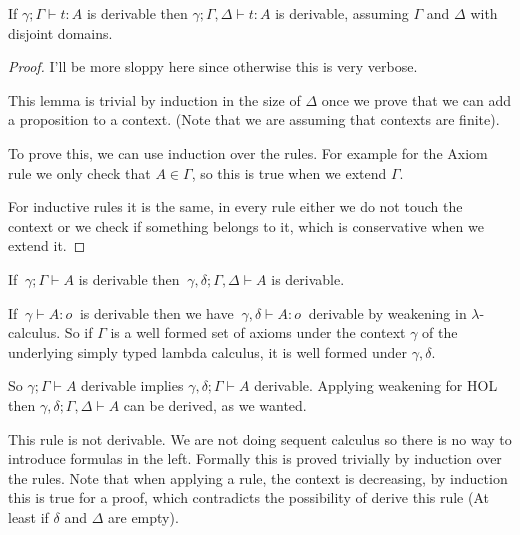\begin{lemma} 
\label{weakening}
  
  If $\gamma ; \Gamma \vdash t : A$ is derivable
  then $ \gamma ; \Gamma,\Delta \vdash t : A$ is derivable, assuming
  $\Gamma$ and $\Delta$ with disjoint domains.  
\end{lemma}

\begin{proof}
  I'll be more sloppy here since otherwise this is very verbose.

  This lemma is trivial by induction in the size of $\Delta$ once we prove
  that we can add a proposition to a context. (Note that we
  are assuming that contexts are finite).

  To prove this, we can use induction over the rules. For example for
  the Axiom rule
  we only check that $A \in \Gamma$, so this is true when we extend
  $\Gamma$.

  For inductive rules it is the same, in every rule either we do not touch
  the context or we check if something belongs to it, which is conservative
  when we extend it.
  
\end{proof}

\begin{theorem}[Exercise 21]
  If $\: \gamma ; \Gamma \vdash A$ is derivable then $\: \gamma, \delta ;
  \Gamma, \Delta \vdash A$ is derivable.
\end{theorem}

If $\: \gamma \vdash A : o \:$ is derivable then we have
$\:\gamma,\delta \vdash A : o \:$
derivable by weakening in $\lambda$-calculus.
So if $\Gamma$ is a well formed
set of axioms under the context $\gamma$ of the underlying simply typed
lambda calculus, it is well formed under $\gamma, \delta$.

So $\gamma; \Gamma \vdash A$ derivable implies
$\gamma,\delta; \Gamma \vdash A$ derivable.
Applying weakening for HOL then $\gamma,\delta; \Gamma, \Delta \vdash A$ can
be derived, as we wanted.

This rule is not derivable. We are not doing sequent calculus so there
is no way to introduce formulas in the left. Formally this is proved
trivially by induction over the rules.
Note that when applying a rule, the
context is decreasing, by induction this is true for a proof,
which contradicts the possibility of derive this rule (At least if $\delta$
and $\Delta$ are empty).

